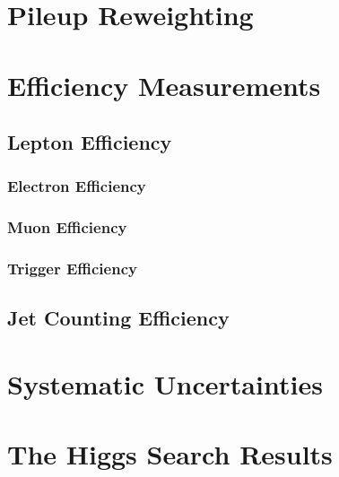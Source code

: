 \documentclass{cmspaper}
\begin{document}
\section{Pileup Reweighting}
     \label{sec:pileupReweighting}

\section{Efficiency Measurements}
     \label{sec:alleff}
     \subsection{Lepton Efficiency}
     \label{sec:efficiency}
	 \subsubsection{Electron Efficiency}
	 \label{sec:eff_electron}
	 \subsubsection{Muon Efficiency}
	 \label{sec:eff_muon}
	 \subsubsection{Trigger Efficiency}
	 \label{sec:eff_trigger}
     \subsection{Jet Counting Efficiency}

\section{Systematic Uncertainties}
   \label{sec:systematics}

\newpage 


\section{The Higgs Search Results}
   \label{sec:dataresults}
\end{document}
